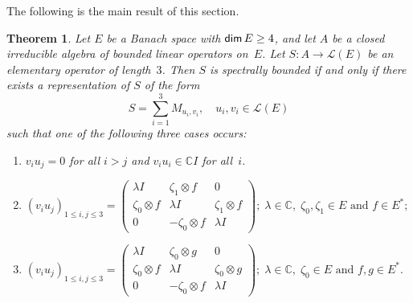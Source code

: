 \documentclass[a4paper,12pt,reqno]{amsart}
\numberwithin{equation}{section}
\newtheorem{thm}{Theorem}[section]
\theoremstyle{definition}
\begin{document}
The following is the main result of this section.

\begin{thm}\label{3-spb}
Let  $E$ be a Banach space  with ${{\sf dim}\,} E\geq 4$, and let $A$ be a closed irreducible algebra of bounded linear operators on~$E$.
Let  ${S}\colon A \rightarrow {{\mathscr L}(E)}$ be an elementary operator of length~$3$.
Then ${S}$ is spectrally bounded  if and only if there exists a representation of ${S}$ of the form
\begin{equation}
{S}= \sum_{i=1}^3 M_{u_i,v_i},\quad u_i, v_i \in {{\mathscr L}(E)}
\end{equation}
such that one of the following three cases occurs:

\smallskip
\begin{enumerate}
\item[{\rm (i)}] $v_i u_j=0$ for all $i > j$ and $v_i u_i \in {\mathbb{C}} I$ for all~$i$.
\smallskip
\item[{\rm (ii)}] $(v_iu_j)_{1 \leq i,j \leq 3}= \left(\begin{array}{ccc}
                                             \lambda I & \zeta_1 \otimes f & 0 \\
                                             \zeta_0 \otimes f & \lambda I & \zeta_1 \otimes f \\
                                             0 & - \zeta_0 \otimes f &\lambda I
                                           \end{array}\right); \;  \lambda \in {\mathbb{C}}, \; \zeta_0, \zeta_1 \in E \text { and } f \in E^*; $
\smallskip
\item[{\rm (iii)}] $(v_iu_j)_{1 \leq i,j \leq 3}= \left(\begin{array}{ccc}
                                             \lambda I & \zeta_0 \otimes g & 0 \\
                                             \zeta_0 \otimes f & \lambda I & \zeta_0 \otimes g \\
                                             0 & - \zeta_0 \otimes f & \lambda I
                                           \end{array}\right); \; \lambda \in {\mathbb{C}}, \;  \zeta_0 \in E \text { and } f,g \in E^*. $
\end{enumerate}
\end{thm}
\end{document}
